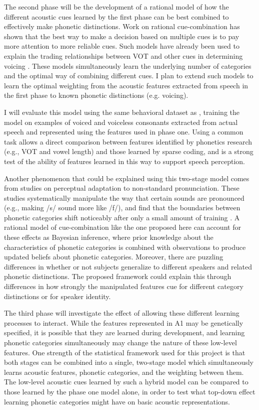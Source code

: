 \documentclass[12pt]{article}
\begin{document}
The second phase will be the development of a rational model of how the different acoustic cues learned by the first phase can be best combined to effectively make phonetic distinctions.  Work on rational cue-combination has shown that the best way to make a decision based on multiple cues is to pay more attention to more reliable cues.  Such models have already been used to explain the trading relationships between VOT and other cues in determining voicing \cite{Toscano2008}.  These models simultaneously learn the underlying number of categories and the optimal way of combining different cues.  I plan to extend such models to learn the optimal weighting from the acoustic features extracted from speech in the first phase to known phonetic distinctions (e.g. voicing).

I will evaluate this model using the same behavioral dataset as \cite{Toscano2008}, training the model on examples of voiced and voiceless consonants extracted from actual speech and represented using the features used in phase one.  Using a common task allows a direct comparison between features identified by phonetics research (e.g., VOT and vowel length) and those learned by sparse coding, and is a strong test of the ability of features learned in this way to support speech perception.

Another phenomenon that could be explained using this two-stage model comes from studies on perceptual adaptation to non-standard pronunciation.  These studies systematically manipulate the way that certain sounds are pronounced (e.g., making /s/ sound more like /f/), and find that the boundaries between phonetic categories shift noticeably after only a small amount of training \cite{Kraljic2006}.  A rational model of cue-combination like the one proposed here can account for these effects as Bayesian inference, where prior knowledge about the characteristics of phonetic categories is combined with observations to produce updated beliefs about phonetic categories.  Moreover, there are puzzling differences in whether or not subjects generalize to different speakers and related phonetic distinctions.  The proposed framework could explain this through differences in how strongly the manipulated features cue for different category distinctions or for speaker identity.

The third phase will investigate the effect of allowing these different learning processes to interact.  While the features represented in A1 may be genetically specified, it is possible that they are learned during development, and learning phonetic categories simultaneously may change the nature of these low-level features.  One strength of the statistical framework used for this project is that both stages can be combined into a single, two-stage model which simultaneously learns acoustic features, phonetic categories, and the weighting between them.  The low-level acoustic cues learned by such a hybrid model can be compared to those learned by the phase one model alone, in order to test what top-down effect learning phonetic categories might have on basic acoustic representations.
\end{document}
